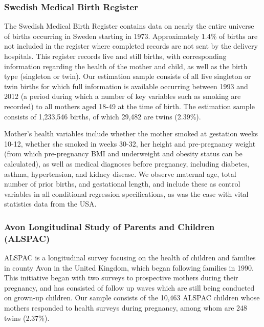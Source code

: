 \documentclass{nature}
\begin{document}
\begin{linenumbers}
\subsubsection{Swedish Medical Birth Register}
The Swedish Medical Birth Register contains data on nearly the entire universe of births occurring in Sweden starting in 1973\cite{EPC2003}.  Approximately 1.4\% of births are not included in the register where completed records are not sent by the delivery hospitals\cite{EPC2003}.  This register records live and still births, with corresponding information regarding the health of the mother and child, as well as the birth type (singleton or twin).  Our estimation sample consists of all live singleton or twin births for which full information is available occurring between 1993 and 2012 (a period during which a number of key variables such as smoking are recorded) to all mothers aged 18-49 at the time of birth.  The estimation sample consists of 1,233,546 births, of which 29,482 are twins (2.39\%). 

Mother's health variables include whether the mother smoked at gestation weeks 10-12, whether she smoked in weeks 30-32, her height and pre-pregnancy weight (from which pre-pregnancy BMI and underweight and obesity status can be calculated), as well as medical diagnoses before pregnancy,  including diabetes, asthma, hypertension, and kidney disease.  We observe maternal age, total number of prior births, and gestational length, and include these as control variables in all conditional regression specifications, as was the case with vital statistics data from the USA.  

\subsubsection{Avon Longitudinal Study of Parents and Children (ALSPAC)}
ALSPAC is a longitudinal survey focusing on the health of children and families in county Avon in the United Kingdom, which began following families in 1990.  This initiative began with two surveys to prospective mothers during their pregnancy, and has consisted of follow up waves which are still being conducted on grown-up children.  Our sample consists of the 10,463 ALSPAC children whose mothers responded to health surveys during pregnancy, among whom are 248 twins (2.37\%).



\end{linenumbers}
\end{document}
